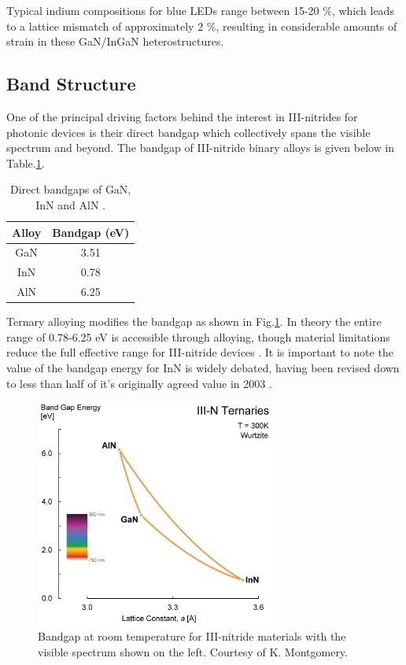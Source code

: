 Typical indium compositions for blue LEDs range between 15-20 $\%$, which leads to a lattice mismatch of approximately 2 $\%$, resulting in considerable amounts of strain in these GaN/InGaN heterostructures.

\subsection{Band Structure} 
\label{section1.1.2}

One of the principal driving factors behind the interest in III-nitrides for photonic devices is their direct bandgap which collectively spans the visible spectrum and beyond. The bandgap of III-nitride binary alloys is given below in Table.\ref{tab1.2}.

\begin{table}[!htb]
	\centering
	\begin{tabular}{cc}
		Alloy & Bandgap (eV) \\
		\hline\hline
		GaN   & 3.51 \\
		InN   & 0.78 \\
		AlN   & 6.25  \\ 
		\hline
	\end{tabular}
	\caption{Direct bandgaps of GaN, InN and AlN \cite{Vurgaftman2003}.}
	\label{tab1.2}
\end{table}

Ternary alloying modifies the bandgap as shown in Fig.\ref{bgap}. In theory the entire range of 0.78-6.25 eV is accessible through alloying, though material limitations reduce the full effective range for III-nitride devices \cite{Scholz2012}. It is important to note the value of the bandgap energy for InN is widely debated, having been revised down to less than half of it's originally agreed value in 2003 \cite{Vurgaftman2003}.

\begin{figure}[h]
	\centering
	\includegraphics[width=0.7\textwidth]{Figs/Ch1/III-N-Ternaries-update.jpg}
	\caption {Bandgap at room temperature for III-nitride materials with the visible spectrum shown on the left. Courtesy of K. Montgomery.}
	\label{bgap}
\end{figure}
\FloatBarrier

